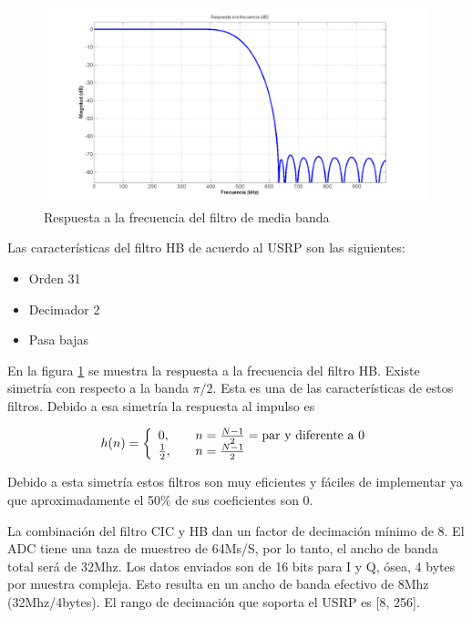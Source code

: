 \begin{figure}[hpt]
\centering
	\includegraphics[width=5.5in]{figs/hbresponse}
	\caption{Respuesta a la frecuencia del filtro de media banda}
	\label{fig:hbresp}
\end{figure}

Las caracter\'isticas del filtro HB de acuerdo al USRP son las siguientes:

\begin{itemize}
  \item Orden 31
  \item Decimador 2
  \item Pasa bajas
\end{itemize}

En la figura \ref{fig:hbresp} se muestra la respuesta a la frecuencia del filtro HB.
Existe simetr\'ia con respecto a la banda $\pi /2$. Esta es una de las
caracter\'isticas de estos filtros. Debido a esa simetr\'ia la respuesta al
impulso es

\begin{equation}
h(n)=\left\{
\begin{array}{l l}
0, & \quad n=\frac{N-1}{2}=\text{par y diferente a 0}\\
\frac{1}{2}, & \quad n=\frac{N-1}{2}
\end{array}\right.
\end{equation}

Debido a esta simetr\'ia estos filtros son muy eficientes y f\'aciles de
implementar ya que aproximadamente el 50\% de sus coeficientes son 0.

La combinaci\'on del filtro CIC y HB dan un factor de decimaci\'on m\'inimo de
8. El ADC tiene una taza de muestreo de 64Ms/S, por lo tanto, el ancho de banda
total ser\'a de 32Mhz. Los datos enviados son de 16 bits para I y Q, \'osea, 4
bytes por muestra compleja. Esto resulta en un ancho de banda efectivo de 8Mhz
(32Mhz/4bytes). El rango de decimaci\'on que soporta el USRP es [8, 256].

